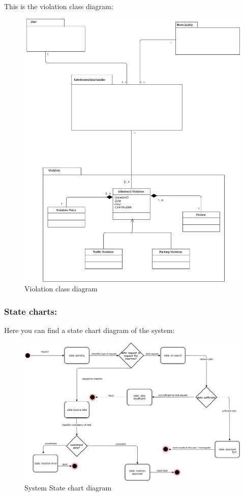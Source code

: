 \documentclass[titlepage]{article}
\begin{document}
This is the violation class diagram:
\begin{figure}[h
]
	\includegraphics[scale=0.3]{UML violation v1.1.png}
	\centering
	\caption{Violation class diagram}
\end{figure}
\FloatBarrier

\subsubsection{State charts: }
Here you can find a state chart diagram of the system:

\begin{figure}[h
]
    \includegraphics[scale=0.3]{State_chart.png}
	\centering
	\caption{System State chart diagram}
\end{figure}
\FloatBarrier
\end{document}
